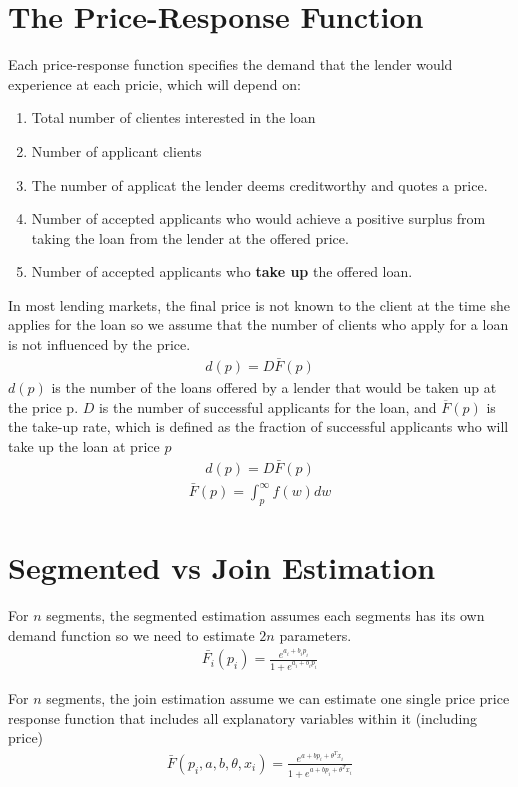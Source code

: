 \documentclass[12pt]{book}
\begin{document}
\section{The Price-Response Function}
Each price-response function specifies the demand that the lender would experience at each pricie, which will depend on:
\begin{enumerate}
    \item Total number of clientes interested in the loan
    \item Number of applicant clients
    \item The number of applicat the lender deems creditworthy and quotes a price.
    \item Number of accepted applicants who would achieve a positive surplus from taking the loan from the lender at the offered price.
    \item Number of accepted applicants who \textbf{ take up} the offered loan.
\end{enumerate}
In most lending markets, the final price is not known to the client at the time she applies for the loan so we assume that the number of clients who apply for a loan is not influenced by the price.
\begin{align}
d(p)=D\bar{F}(p)
\end{align}
$d(p)$ is the number of the loans offered by a lender that would be taken up at the price p. $D$ is the number of successful applicants for the loan, and $\overline{F}(p)$ is the take-up rate, which is defined as the fraction of successful applicants who will take up the loan at price $p$
\begin{align}
d(p)=D\bar{F}(p)
\end{align}
\begin{align}
\bar{F}(p)=\int^\infty_p f(w)dw
\end{align}
\section{Segmented vs Join Estimation}
For $n$ segments, the segmented estimation assumes each segments has its own demand function so we need to estimate $2n$ parameters.
\begin{align}
\bar{F_i}(p_i)=\frac{e^{a_i+b_i p_i}}{1+e^{a_i+b_i p_i}}
\end{align}

For $n$ segments, the join estimation assume we can estimate one single price price response function that includes all explanatory variables within it (including price)
\begin{align}
\bar{F}(p_i,a,b,\theta,x_i)=\frac{e^{a+b p_i+\theta^T x_i}}{1+e^{a+b p_i+\theta^T x_i}}
\end{align}
\end{document}
